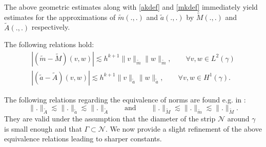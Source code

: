 \documentclass{siamart0516}
\numberwithin{equation}{section}
\numberwithin{theorem}{section}
\numberwithin{figure}{section}
\begin{document}
The above geometric estimates along with \eqref{akdef} and \eqref{mkdef} immediately yield estimates for the approximations of $\tilde m(.,.)$ and $\tilde a(.,.)$ by $\widetilde M(.,.)$ and $\widetilde A(.,.)$ respectively.

\begin{corollary}\label{c:geom}
	The following relations hold:
	\begin{align}
	|(\tilde m-\widetilde M)(v,w)|\lesssim h^{k+1}\|v\|_{\tilde m}\|w\|_{\tilde m}, \qquad \forall v,w \in L^2(\gamma)
	\label{m-mk}
\\
	|(\tilde a - \widetilde A)(v,w)|\lesssim h^{k+1}\|v\|_{\tilde a}\|w\|_{\tilde a}, \qquad \forall v,w \in H^1(\gamma).
	\label{a-ak}
	\end{align}
\end{corollary}

The following relations regarding the equivalence of norms are found e.g. in \cite{D09}:
\begin{equation}\label{e:equiv_rough}
\| .\|_{\widetilde A}  \lesssim \| . \|_{\tilde a} \lesssim \| .\|_{\widetilde A} \qquad \textrm{and} \qquad 
\| .\|_{\widetilde M}  \lesssim \| . \|_{\tilde m} \lesssim \| .\|_{\widetilde M}.
\end{equation}
They are valid under the assumption that the diameter of the strip $\mathcal N$ around $\gamma$ is small enough and that $\Gamma \subset \mathcal N$.
We now provide a slight refinement of the above equivalence relations leading to sharper constants. 
\end{document}
